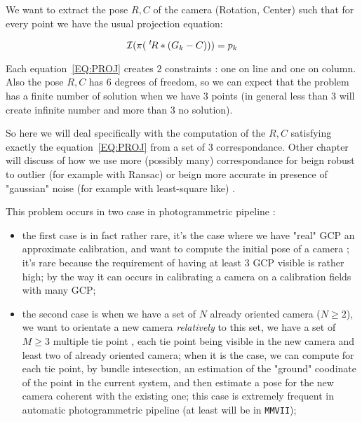 We want to extract the pose $R,C$ of the camera (Rotation, Center) such that for every point
we have the usual projection equation:

\begin{equation}
       \mathcal I(\pi (\; ^{t} \! R*(G_k-C))) = p_k \label{EQ:PROJ}
\end{equation}


Each equation~\ref{EQ:PROJ}  creates $2$ constraints : one on line and one on column.
Also the pose $R,C$ has $6$ degrees of freedom, so we can expect that the problem has
a finite number of solution when we have $3$ points (in general less than $3$ will create
infinite number and more than $3$ no solution).

So here we will deal specifically  with the computation of the $R,C$ satisfying
exactly the equation~\ref{EQ:PROJ}  from a set of $3$ correspondance. Other
chapter will discuss of how we use more (possibly many) correspondance for beign 
robust to outlier (for
example with Ransac) or beign more accurate in presence of "gaussian" noise (for 
example with least-square like) .


This problem occurs in two case in photogrammetric pipeline :

\begin{itemize}
   \item the first case is in fact rather rare, it's the case where we have "real" GCP
         an approximate calibration, and want to compute the initial pose of a camera ;
         it's rare because the requirement of having at least $3$ GCP visible is rather
         high; by the way it can occurs in calibrating a camera on a calibration fields
         with many GCP;

 \item the second case is when we have a set of $N$ already oriented camera  ($N\geq 2 $),
       we want to orientate a new camera \emph{relatively} to this set, we have a
       set of $M \geq 3$ multiple tie point , each tie point being visible in the new
       camera and least two of already oriented camera;  when it is the case,
       we can compute for each tie point, by bundle intesection, an estimation of the
       "ground" coodinate of the point in the current system, and then estimate a pose
       for the new camera coherent with the existing one;
       this case is extremely frequent in automatic photogrammetric
       pipeline (at least will be in {\tt MMVII});

\end{itemize}


